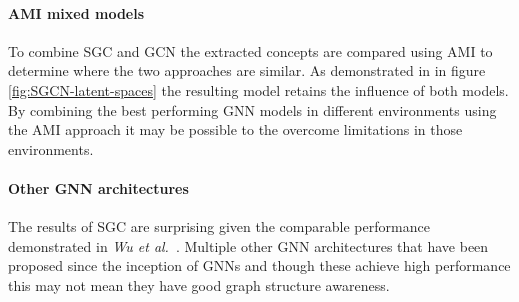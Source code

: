 \paragraph{AMI mixed models}
To combine SGC and GCN the extracted concepts are compared using AMI to determine where the two approaches are similar.
As demonstrated in  in figure \ref{fig:SGCN-latent-spaces} the resulting model retains the influence of both models.
By combining the best performing GNN models in different environments using the AMI approach it may be possible to the overcome limitations in those environments.

\paragraph{Other GNN architectures}
The results of SGC are surprising given the comparable performance demonstrated in \textit{Wu et al.}~\cite{wu2019simplifying}.
Multiple other GNN architectures that have been proposed since the inception of GNNs and though these achieve high performance this may not mean they have good graph structure awareness.
